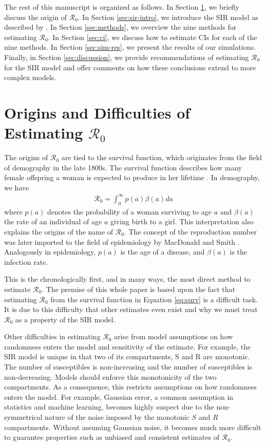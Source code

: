 \documentclass[12pt]{article}
\newcommand{\wxxsir}{nine }
\newcommand{\rr}{\ensuremath{\mathcal{R}_0}}
\begin{document}
The rest of this manuscript is organized as follows.  In Section \ref{sec:r0}, we briefly discuss the origin of $\rr$.  In Section \ref{sec:sir-intro}, we introduce the SIR model as described by \cite{Kermack700}.  In Section \ref{sec:methods}, we overview the \wxxsir methods for estimating $\rr$. In Section \ref{sec:ci}, we discuss how to estimate CIs for each of the \wxxsir methods.  In Section \ref{sec:sim-res}, we present the results of our simulations.  Finally, in Section \ref{sec:discussion}, we provide recommendations of estimating $\rr$ for the SIR model and offer comments on how these conclusions extend to more complex models.


\section{Origins and Difficulties of Estimating $\rr$}
\label{sec:r0}

The origins of $\rr$ are tied to the survival function, which originates from the field of demography in the late 1800s.  The survival function describes how many female offspring a woman is expected to produce in her lifetime \citep{dietz1993estimation}.  In demography, we have
\begin{align}\label{eq:surv}
\rr = \int_0^\infty p(a) \beta(a) da
\end{align}
where $p(a)$ denotes the probability of a woman surviving to age $a$ and $\beta(a)$ the rate of an individual of age $a$ giving birth to a  girl.   This interpretation also explains the origins of the name of $\rr$.  The concept of the reproduction number was later imported to the field of epidemiology by MacDonald and Smith \citep{dietz1993estimation}.  Analogously in epidemiology, $p(a)$ is the age of a disease, and $\beta(a)$ is the infection rate.

This is the chronologically first, and in many ways, the most direct method to estimate $\rr$.  The premise of this whole paper is based upon the fact that estimating $\rr$ from the survival function in Equation \eqref{eq:surv} is a difficult task.  It is due to this difficulty that other estimates even exist and why we must treat $\rr$ as a property of the SIR model.

Other difficulties in estimating $\rr$ arise from model assumptions on how randomness enters the model and sensitivity of the estimate.  For example, the SIR model is unique in that two of its compartments, S and R are monotonic.  The number of susceptibles is non-increasing and the number of susceptibles is non-decreasing.  Models should enforce this monotonicity of the two compartments.  As a consequence, this restricts assumptions on how randomness enters the model.  For example, Gaussian error, a common assumption in statistics and machine learning, becomes highly suspect due to the non-symmetrical nature of the noise imposed by the monotonic $S$ and $R$ compartments.  Without assuming Gaussian noise, it becomes much more difficult to guarantee properties such as unbiased and consistent estimates of $\rr$.
\end{document}
